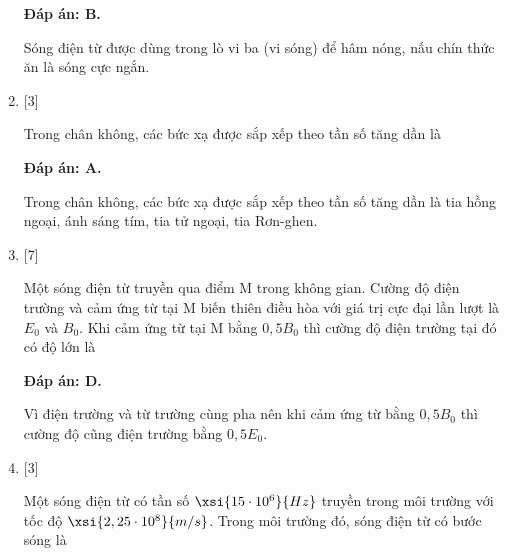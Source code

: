 \begin{enumerate}[label=\bfseries Câu \arabic*:]
	\loigiai
	{		\textbf{Đáp án: B.}
		
		Sóng điện từ được dùng trong lò vi ba (vi sóng) để hâm nóng, nấu chín thức ăn là sóng cực ngắn.
		
	}
	
	\item {} [3] %
	\cauhoi
	{Trong chân không, các bức xạ được sắp xếp theo tần số tăng dần là
	}
	
	\loigiai
	{		\textbf{Đáp án: A.}
		
		Trong chân không, các bức xạ được sắp xếp theo tần số tăng dần là tia hồng ngoại, ánh sáng tím, tia tử ngoại, tia Rơn-ghen.
		
	}
	
	\item {} [7] %
	\cauhoi
	{Một sóng điện từ truyền qua điểm M trong không gian. Cường độ điện trường và cảm ứng từ tại M biến thiên điều hòa với giá trị cực đại lần lượt là $E_0$ và $B_0$. Khi cảm ứng từ tại M bằng $ 0,5B_0$ thì cường độ điện trường tại đó có độ lớn là
	}
	
	\loigiai
	{		\textbf{Đáp án: D.}
		
		Vì điện trường và từ trường cùng pha nên khi cảm ứng từ bằng $0,5B_0$ thì cường độ cũng điện trường bằng $0,5E_0$.
		
	}
	
	
	\item {} [3]
	\cauhoi
	{Một sóng điện từ có tần  số $\xsi{15\cdot 10^{6}}{Hz}$ truyền trong môi trường với tốc độ $\xsi{2,25\cdot 10^{8}}{m/s}$. Trong môi trường đó, sóng điện từ có bước sóng là
	}
	

\end{enumerate}

